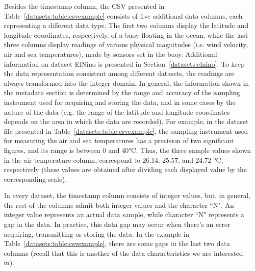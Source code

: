 Besides the timestamp column, the CSV presented in Table~\ref{datasets:table:csvexample} consists of five additional data columns, each representing a different data type. The first two columns display the latitude and longitude coordinates, respectively, of a buoy floating in the ocean, while the last three columns display readings of various physical magnitudes (i.e. wind velocity, air and sea temperatures), made by sensors set in the buoy. Additional information on dataset ElNino is presented in Section~\ref{datasets:elnino}. To keep the data representation consistent among different datasets, the readings are always transformed into the integer domain. In general, the information shown in the metadata section is determined by the range and accuracy of the sampling instrument used for acquiring and storing the data, and in some cases by the nature of the data (e.g. the range of the latitude and longitude coordinates depends on the area in which the data are recorded). For example, in the dataset file presented in Table~\ref{datasets:table:csvexample}, the sampling instrument used for measuring the air and sea temperatures has a precision of two significant figures, and its range is between 0 and 40°C. Thus, the three sample values shown in the air temperature column, correspond to 26.14, 25.57, and 24.72 °C, respectively (these values are obtained after dividing each displayed value by the corresponding scale). 


In every dataset, the timestamp column consists of integer values, but, in general, the rest of the columns admit both integer values and the character ``N". An integer value represents an actual data sample, while character ``N" represents a gap in the data. In practice, this data gap may occur when there's an error acquiring, transmitting or storing the data. In the example in Table~\ref{datasets:table:csvexample}, there are some gaps in the last two data columns (recall that this is another of the data characteristics we are interested in).

